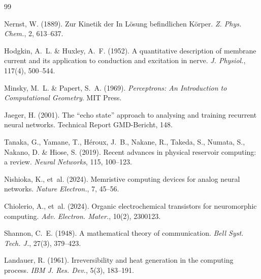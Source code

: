 \documentclass[11pt]{article}
\begin{document}
\begin{thebibliography}{99}

 Nernst, W. (1889). Zur Kinetik der In L\"osung befindlichen K\"orper. \textit{Z. Phys. Chem.}, 2, 613–637.

 Hodgkin, A.~L. \& Huxley, A.~F. (1952). A quantitative description of membrane current and its application to conduction and excitation in nerve. \textit{J. Physiol.}, 117(4), 500–544.

 Minsky, M.~L. \& Papert, S.~A. (1969). \textit{Perceptrons: An Introduction to Computational Geometry}. MIT Press.

 Jaeger, H. (2001). The ``echo state'' approach to analysing and training recurrent neural networks. Technical Report GMD-Bericht, 148.

 Tanaka, G., Yamane, T., Héroux, J.~B., Nakane, R., Takeda, S., Numata, S., Nakano, D. \& Hiose, S. (2019). Recent advances in physical reservoir computing: a review. \textit{Neural Networks}, 115, 100–123.

 Nishioka, K., et~al. (2024). Memristive computing devices for analog neural networks. \textit{Nature Electron.}, 7, 45–56.

 Chiolerio, A., et~al. (2024). Organic electrochemical transistors for neuromorphic computing. \textit{Adv. Electron. Mater.}, 10(2), 2300123.

 Shannon, C.~E. (1948). A mathematical theory of communication. \textit{Bell Syst. Tech. J.}, 27(3), 379–423.

 Landauer, R. (1961). Irreversibility and heat generation in the computing process. \textit{IBM J. Res. Dev.}, 5(3), 183–191.

\end{thebibliography}
\end{document}

